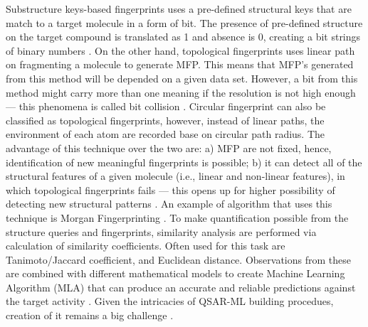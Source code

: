 Substructure keys-based fingerprints uses a pre-defined structural keys that are match to a target molecule in a form of bit. The presence of pre-defined structure on the target compound is translated as 1 and absence is 0, creating a bit strings of binary numbers \cite{christie1990MACCS}. On the other hand, topological fingerprints uses linear path on fragmenting a molecule to generate MFP. This means that MFP's generated from this method will be depended on a given data set. However, a bit from this method might carry more than one meaning if the resolution is not high enough --- this phenomena is called bit collision \cite{cereto2015MF}. Circular fingerprint can also be classified as topological fingerprints, however, instead of linear paths, the environment of each atom are recorded base on circular path radius. The advantage of this technique over the two are: a) MFP are not fixed, hence, identification of new meaningful fingerprints is possible; b) it can detect all of the structural features of a given molecule (i.e., linear and non-linear features), in which topological fingerprints fails --- this opens up for higher possibility of detecting new structural patterns \cite{rogers2010extended}. An example of algorithm that uses this technique is Morgan Fingerprinting \cite{morgan1965generation}. To make quantification possible from the structure queries and fingerprints, similarity analysis are performed via calculation of similarity coefficients. Often used for this task are Tanimoto/Jaccard coefficient, and Euclidean distance. Observations from these are combined with different mathematical models to create Machine Learning Algorithm (MLA) that can produce an accurate and reliable predictions against the target activity \cite{keith2021qSAR}. Given the intricacies of QSAR-ML building procedues, creation of it remains a big challenge \cite{gao2023uni-qsar}.

